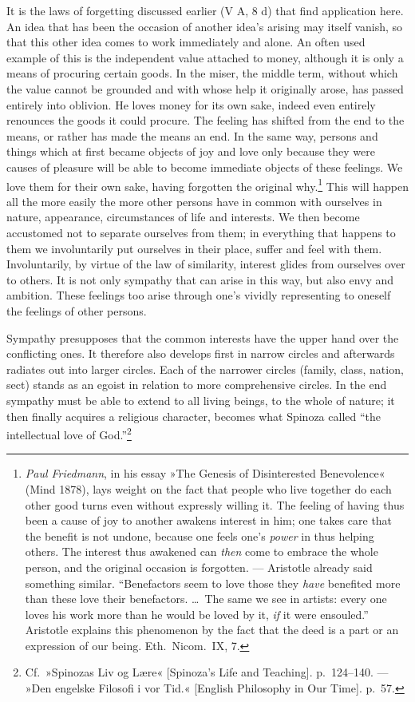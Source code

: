 \documentclass[12pt,a4paper]{book}
\newcommand{\opage}[1]{\marginnote{\footnotesize\textit{[#1]}}}
\begin{document}
It is the laws of forgetting discussed earlier (V A, 8 d) that find
application here. An idea that has been the occasion of another idea's
arising may itself vanish, so that this other idea comes to work
immediately and alone. An often used example of this is the independent
value attached to money, although it is only a means of procuring
certain goods. In the miser, the middle term, without which the value
cannot be grounded and with whose help it originally arose, has passed
entirely into oblivion. He loves money for its own sake, indeed even
entirely renounces the goods it could procure. The feeling has shifted
from the end to the means, or rather has made the means an end. In the
same way, persons and things which at first became objects of joy and
love only because they were causes of pleasure will be able to become
immediate objects of these feelings. We love them for their own sake,
having forgotten the original why.\footnote{\emph{Paul Friedmann}, in
his essay »The Genesis of Disinterested Benevolence« (Mind 1878), lays
weight on the fact that people who live together do each other good
turns even without expressly willing it. The feeling of having thus been
a cause of joy to another awakens interest in him; one takes care that
the benefit is not undone, because one feels one's \emph{power} in thus
helping others. The interest thus awakened can \emph{then} come to
embrace the whole person, and the original occasion is forgotten. ---
Aristotle already said something similar. ``Benefactors seem to love
those they \emph{have} benefited more than these love their benefactors.
\ldots\ The same we see in artists: every one loves his work more than
he would be loved by it, \emph{if} it were ensouled.'' Aristotle
explains this phenomenon by the fact that the deed is a part or an
expression of our being. Eth.\ Nicom.\ IX, 7.} This
\opage{295}will happen all the more easily the more other persons have in
common with ourselves in nature, appearance, circumstances of life and
interests. We then become accustomed not to separate ourselves from
them; in everything that happens to them we involuntarily put ourselves
in their place, suffer and feel with them. Involuntarily, by virtue of
the law of similarity, interest glides from ourselves over to others. It
is not only sympathy that can arise in this way, but also envy and
ambition. These feelings too arise through one's vividly representing to
oneself the feelings of other persons.

Sympathy presupposes that the common interests have the upper hand over
the conflicting ones. It therefore also develops first in narrow circles
and afterwards radiates out into larger circles. Each of the narrower
circles (family, class, nation, sect) stands as an egoist in relation to
more comprehensive circles. In the end sympathy must be able to extend
to all living beings, to the whole of nature; it then finally acquires a
religious character, becomes what Spinoza called ``the intellectual love
of God.''\footnote{Cf.\ »Spinozas Liv og Lære« [Spinoza's Life and
Teaching]. p.~124--140. --- »Den engelske Filosofi i vor Tid.«
[English Philosophy in Our Time]. p.~57.}
\end{document}
